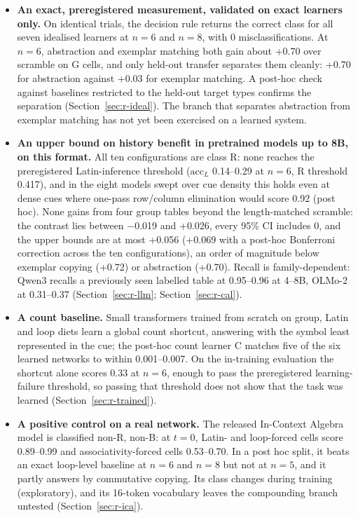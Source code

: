 \documentclass[11pt]{article}
\begin{document}
\begin{itemize}
  \item \textbf{An exact, preregistered measurement, validated on exact learners only.} On identical trials, the decision rule returns the correct class for all seven idealised learners at $n = 6$ and $n = 8$, with 0 misclassifications. At $n = 6$, abstraction and exemplar matching both gain about +0.70 over scramble on G cells, and only held-out transfer separates them cleanly: +0.70 for abstraction against +0.03 for exemplar matching. A post-hoc check against baselines restricted to the held-out target types confirms the separation (Section~\ref{sec:r-ideal}). The branch that separates abstraction from exemplar matching has not yet been exercised on a learned system.
  \item \textbf{An upper bound on history benefit in pretrained models up to 8B, on this format.} All ten configurations are class R: none reaches the preregistered Latin-inference threshold ($\mathrm{acc}_L$ 0.14--0.29 at $n = 6$, R threshold 0.417), and in the eight models swept over cue density this holds even at dense cues where one-pass row/column elimination would score 0.92 (post hoc). None gains from four group tables beyond the length-matched scramble: the contrast lies between $-$0.019 and +0.026, every 95\% CI includes 0, and the upper bounds are at most +0.056 (+0.069 with a post-hoc Bonferroni correction across the ten configurations), an order of magnitude below exemplar copying (+0.72) or abstraction (+0.70). Recall is family-dependent: Qwen3 recalls a previously seen labelled table at 0.95--0.96 at 4--8B, OLMo-2 at 0.31--0.37 (Section~\ref{sec:r-llm}; Section~\ref{sec:r-cal}).
  \item \textbf{A count baseline.} Small transformers trained from scratch on group, Latin and loop diets learn a global count shortcut, answering with the symbol least represented in the cue; the post-hoc count learner C matches five of the six learned networks to within 0.001--0.007. On the in-training evaluation the shortcut alone scores 0.33 at $n = 6$, enough to pass the preregistered learning-failure threshold, so passing that threshold does not show that the task was learned (Section~\ref{sec:r-trained}).
  \item \textbf{A positive control on a real network.} The released In-Context Algebra model is classified non-R, non-B: at $t = 0$, Latin- and loop-forced cells score 0.89--0.99 and associativity-forced cells 0.53--0.70. In a post hoc split, it beats an exact loop-level baseline at $n = 6$ and $n = 8$ but not at $n = 5$, and it partly answers by commutative copying. Its class changes during training (exploratory), and its 16-token vocabulary leaves the compounding branch untested (Section~\ref{sec:r-ica}).

\end{itemize}
\end{document}
